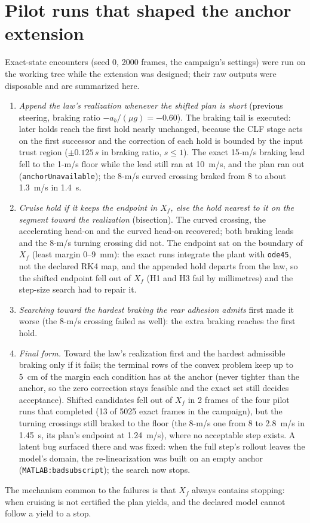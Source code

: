 \documentclass[11pt]{article}
\begin{document}
\section{Pilot runs that shaped the anchor extension}
\label{sec:pilot}
Exact-state encounters (seed 0, 2000 frames, the campaign's settings) were run
on the working tree while the extension was designed; their raw outputs were
disposable and are summarized here.
\begin{enumerate}
\item \emph{Append the law's realization whenever the shifted plan is short}
(previous steering, braking ratio $-a_b/(\mu g)=-0.60$). The braking tail is
executed: later holds reach the first hold nearly unchanged, because the CLF
stage acts on the first successor and the correction of each hold is bounded
by the input trust region ($\pm0.125\,s$ in braking ratio, $s\le1$). The
exact 15-m/s braking lead fell to the 1-m/s floor while the lead still ran at
10~m/s, and the plan ran out (\texttt{anchorUnavailable}); the 8-m/s curved
crossing braked from 8 to about 1.3~m/s in 1.4~s.
\item \emph{Cruise hold if it keeps the endpoint in $X_f$, else the hold
nearest to it on the segment toward the realization} (bisection). The curved
crossing, the accelerating head-on and the curved head-on recovered; both
braking leads and the 8-m/s turning crossing did not. The endpoint sat on the
boundary of $X_f$ (least margin 0--9~mm): the exact runs integrate the plant
with \texttt{ode45}, not the declared RK4 map, and the appended hold departs
from the law, so the shifted endpoint fell out of $X_f$ (H1 and H3 fail by
millimetres) and the step-size search had to repair it.
\item \emph{Searching toward the hardest braking the rear adhesion admits}
first made it worse (the 8-m/s crossing failed as well): the extra braking
reaches the first hold.
\item \emph{Final form.} Toward the law's realization first and the hardest
admissible braking only if it fails; the terminal rows of the convex problem
keep up to 5~cm of the margin each condition has at the anchor (never tighter
than the anchor, so the zero correction stays feasible and the exact set
still decides acceptance). Shifted candidates fell out of $X_f$ in 2 frames
of the four pilot runs that completed (13 of 5025 exact frames in the
campaign), but the turning crossings still braked to the floor (the 8-m/s one
from 8 to 2.8~m/s in 1.45~s, its plan's endpoint at 1.24~m/s), where no
acceptable step exists. A latent bug surfaced there and was fixed: when the
full step's rollout leaves the model's domain, the re-linearization was built
on an empty anchor (\texttt{MATLAB:badsubscript}); the search now stops.
\end{enumerate}
The mechanism common to the failures is that $X_f$ always contains stopping:
when cruising is not certified the plan yields, and the declared model cannot
follow a yield to a stop.
\end{document}
